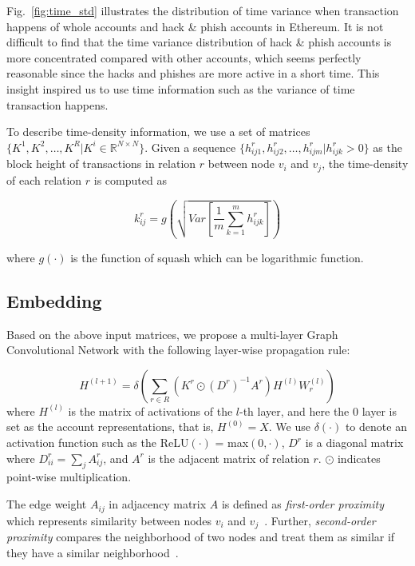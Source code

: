Fig.~\ref{fig:time_std} illustrates the distribution of time variance when transaction happens of whole accounts and hack \& phish accounts in Ethereum. It is not difficult to find that the time variance distribution of hack \& phish accounts is more concentrated compared with other accounts, which seems perfectly reasonable since the hacks and phishes are more active in a short time. This insight inspired us to use time information such as the variance of time transaction happens.

To describe time-density information, we use a set of matrices $\{K^1,K^2,\dots,K^R|K^i\in \mathbb{R}^{N \times N}\}$. Given a sequence $\{h_{ij1}^r,h_{ij2}^r,\dots,h_{ijm}^r | h_{ijk}^r>0\}$ as the block height of transactions in relation $r$ between node $v_i$ and $v_j$, the time-density of each relation $r$ is computed as%

\begin{equation}
k_{ij}^r=g(\sqrt{Var[\frac{1}{m}\sum_{k=1}^m h_{ijk}^r]})
\label{eq:time}
\end{equation}

\noindent where $g(\cdot)$ is the function of squash which can be logarithmic function.

\subsection{Embedding}
\label{sec:rGCN layers}
Based on the above input matrices, we propose a multi-layer Graph Convolutional Network with the following layer-wise propagation rule:

\begin{equation}
H^{(l+1)}=\delta(\sum_{r\in R} (K^r\odot (D^r)^{-1}A^r)H^{(l)}W_r^{(l)})
\end{equation}
\noindent where $H^{(l)}$ is the matrix of activations of the $l$-th layer, and here the $0$ layer is set as the account representations, that is, $H^{(0)}=X$. We use $\delta(\cdot)$ to denote an activation function such as the ReLU$(\cdot)$ = max$(0,\cdot)$, $D^r$ is a diagonal matrix where $D^r_{ii}=\sum_{j}A^r_{ij}$, and $A^r$ is the adjacent matrix of relation $r$. $\odot$ indicates point-wise multiplication.

The edge weight $A_{ij}$ in adjacency matrix $A$ is defined as \emph{first-order proximity} which represents similarity between nodes $v_i$ and $v_j$~\cite{tang2015line}. Further, \emph{second-order proximity} compares the neighborhood of two nodes and treat them as similar if they have a similar neighborhood~\cite{goyal2018graph}.


